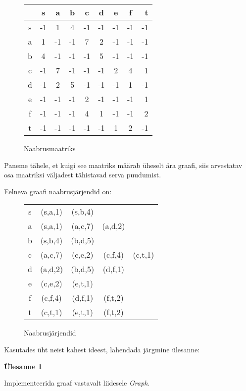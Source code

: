 \documentclass[a4paper]{article}
\begin{document}
\begin{figure}[H]
\centering
\begin{tabular}{c | c c c c c c c r}
& s & a & b & c & d & e & f & t \\
\hline
s & -1 & 1 & 4 & -1 & -1 & -1  & -1 & -1 \\
a & 1 & -1 & -1 & 7 & 2 & -1  & -1 & -1 \\
b & 4 & -1 & -1 & -1 & 5 & -1  & -1 & -1 \\
c & -1 & 7 & -1 & -1 & -1 & 2  & 4 & 1 \\
d & -1 & 2 & 5 & -1 & -1 & -1  & 1 & -1 \\
e & -1 & -1 & -1 & 2 & -1 & -1  & -1 & 1 \\
f & -1 & -1 & -1 & 4 & 1 & -1  & -1 & 2 \\
t & -1 & -1 & -1 & -1 & -1 & 1  & 2 & -1 \\
\end{tabular}
\caption{Naabrusmaatriks}
\end{figure}

Paneme tähele, et kuigi see maatriks määrab üheselt ära graafi, siis arvestatav osa maatriksi väljadest tähistavad serva puudumist.

Eelneva graafi naabrusjärjendid on:

\begin{figure}[H]
\centering
\begin{tabular}{c | c c c c}
\hline
s & (s,a,1) & (s,b,4) & & \\
a & (s,a,1) & (a,c,7) & (a,d,2)  &  \\
b & (s,b,4) & (b,d,5) &  &  \\
c & (a,c,7) & (c,e,2) & (c,f,4) & (c,t,1) \\
d & (a,d,2) & (b,d,5) & (d,f,1) &   \\
e & (c,e,2) & (e,t,1) & &\\
f & (c,f,4) & (d,f,1) & (f,t,2) & \\
t & (c,t,1) & (e,t,1) & (f,t,2) &  \\
\end{tabular}
\caption{Naabrusjärjendid}
\end{figure}

Kasutades üht neist kahest ideest, lahendada järgmine ülesanne:

\begin{problem}
\textbf{Ülesanne 1}

Implementeerida graaf vastavalt liidesele \textit{Graph}.
\end{problem}
\end{document}
